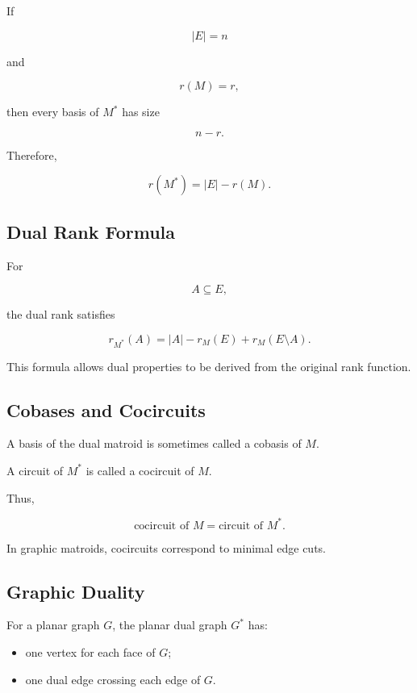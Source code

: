 If

\[
|E|=n
\]

and

\[
r(M)=r,
\]

then every basis of \(M^*\) has size

\[
n-r.
\]

Therefore,

\[
\boxed{
r(M^*)
=
|E|-r(M).
}
\]

\subsection{Dual Rank Formula}
\label{subsec:dual-rank-formula}

For

\[
A\subseteq E,
\]

the dual rank satisfies

\[
\boxed{
r_{M^*}(A)
=
|A|
-r_M(E)
+
r_M(E\setminus A).
}
\]

This formula allows dual properties to be derived from the original
rank function.

\subsection{Cobases and Cocircuits}
\label{subsec:cobases-cocircuits}

A basis of the dual matroid is sometimes called a cobasis of \(M\).

A circuit of \(M^*\) is called a cocircuit of \(M\).

Thus,

\[
\boxed{
\text{cocircuit of }M
=
\text{circuit of }M^*.
}
\]

In graphic matroids, cocircuits correspond to minimal edge cuts.

\subsection{Graphic Duality}
\label{subsec:graphic-duality}

For a planar graph \(G\), the planar dual graph \(G^*\) has:

\begin{itemize}
    \item one vertex for each face of \(G\);
    \item one dual edge crossing each edge of \(G\).
\end{itemize}

